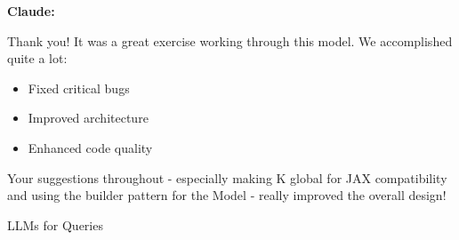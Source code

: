 \begin{frame}

    \textbf{Claude:}

    \medskip
    
  Thank you! It was a great exercise working through this model. We accomplished quite a lot:

  \begin{itemize}
      \item Fixed critical bugs 
      \item Improved architecture 
      \item Enhanced code quality 
  \end{itemize}

  Your suggestions throughout - especially making K global for JAX compatibility and using the builder pattern for
  the Model - really improved the overall design!

\end{frame}

\begin{frame}{LLMs for Queries}
    
    \begin{figure}
       \centering
    \end{figure}

\end{frame}


\begin{frame}
    
    \begin{figure}
       \centering
    \end{figure}

\end{frame}


